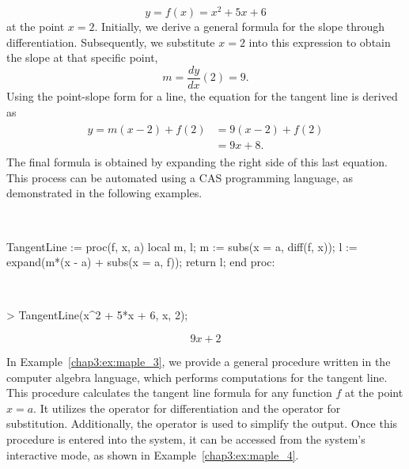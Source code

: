 %
\begin{equation*}
  y = f(x) = x^2 + 5x + 6
\end{equation*}
%
at the point $x = 2$. Initially, we derive a general formula for the slope through differentiation. Subsequently, we substitute $x = 2$ into this expression to obtain the slope at that specific point,
%
\begin{equation*}
  m = \dfrac{dy}{dx}(2) = 9.
\end{equation*}
%
Using the point-slope form for a line, the equation for the tangent line is derived as
%
\begin{equation*}
  \begin{aligned}
    \begin{split}
      y = m(x - 2) + f(2) &= 9(x - 2) + f(2) \\
      &= 9x + 8.
    \end{split}
  \end{aligned}
\end{equation*}
%
The final formula is obtained by expanding the right side of this last equation. This process can be automated using a \ac{CAS} programming language, as demonstrated in the following examples.
%
\begin{example} \phantom{.} \\
  \label{chap3:ex:maple_3}
  \begin{mapleinline}
TangentLine := proc(f, x, a)
  local m, l;
  m := subs(x = a,  diff(f, x));
  l := expand(m*(x - a) + subs(x = a, f));
  return l;
end proc:
  \end{mapleinline}
\end{example}
%
\begin{example} \phantom{.} \\
  \label{chap3:ex:maple_4}
  \begin{mapleinline}
> TangentLine(x^2 + 5*x + 6, x, 2);
    \end{mapleinline}
    \begin{equation*}
      9x + 2
    \end{equation*}
\end{example}
%
In Example~\ref{chap3:ex:maple_3}, we provide a general procedure written in the \Maple{} computer algebra language, which performs computations for the tangent line. This procedure calculates the tangent line formula for any function $f$ at the point $x = a$. It utilizes the  operator for differentiation and the  operator for substitution. Additionally, the  operator is used to simplify the output. Once this procedure is entered into the \Maple{} system, it can be accessed from the system's interactive mode, as shown in Example~\ref{chap3:ex:maple_4}.


